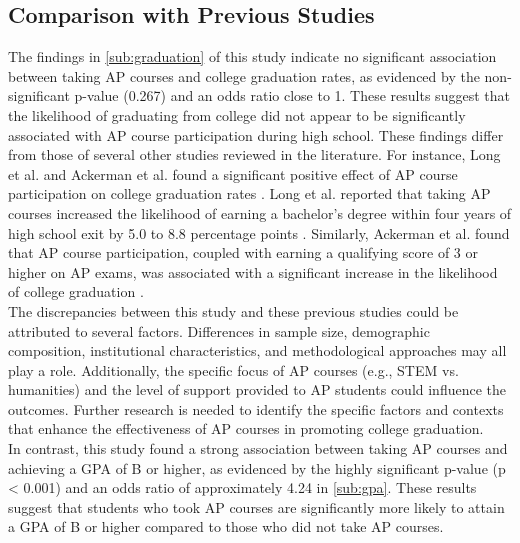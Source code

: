\documentclass[sn-mathphys-num]{sn-jnl}%
\theoremstyle{thmstyleone}%
\theoremstyle{thmstyletwo}%
\theoremstyle{thmstylethree}%
\begin{document}
{\subsection{Comparison with Previous Studies}

The findings in \ref{sub:graduation} of this study indicate no significant association between taking AP courses and college graduation rates, as evidenced by the non-significant p-value (0.267) and an odds ratio close to 1. These results suggest that the likelihood of graduating from college did not appear to be significantly associated with AP course participation during high school. These findings differ from those of several other studies reviewed in the literature. For instance, Long et al. and Ackerman et al. found a significant positive effect of AP course participation on college graduation rates \cite{ackerman2013high, long2012effects}. Long et al. reported that taking AP courses increased the likelihood of earning a bachelor’s degree within four years of high school exit by 5.0 to 8.8 percentage points \cite{long2012effects}. Similarly, Ackerman et al. found that AP course participation, coupled with earning a qualifying score of 3 or higher on AP exams, was associated with a significant increase in the likelihood of college graduation \cite{ackerman2013high}.\\

The discrepancies between this study and these previous studies could be attributed to several factors. Differences in sample size, demographic composition, institutional characteristics, and methodological approaches may all play a role. Additionally, the specific focus of AP courses (e.g., STEM vs. humanities) and the level of support provided to AP students could influence the outcomes. Further research is needed to identify the specific factors and contexts that enhance the effectiveness of AP courses in promoting college graduation.\\

In contrast, this study found a strong association between taking AP courses and achieving a GPA of B or higher, as evidenced by the highly significant p-value (p < 0.001) and an odds ratio of approximately 4.24 in \ref{sub:gpa}. These results suggest that students who took AP courses are significantly more likely to attain a GPA of B or higher compared to those who did not take AP courses.

}
\end{document}
